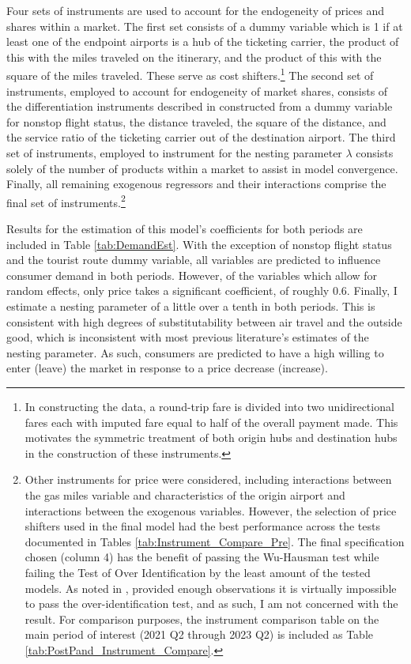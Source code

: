 \documentclass{article}
\begin{document}
	 Four sets of instruments are used to account for the endogeneity of prices and shares within a market. The first set consists of a dummy variable which is 1 if at least one of the endpoint airports is a hub of the ticketing carrier, the product of this with the miles traveled on the itinerary, and the product of this with the square of the miles traveled. These serve as cost shifters.\footnote{In constructing the data, a round-trip fare is divided into two unidirectional fares each with imputed fare equal to half of the overall payment made. This motivates the symmetric treatment of both origin hubs and destination hubs in the construction of these instruments.} The second set of instruments, employed to account for endogeneity of market shares, consists of the differentiation instruments described in \citet{gandhi_measuring_2019} constructed from a dummy variable for nonstop flight status, the distance traveled, the square of the distance, and the service ratio of the ticketing carrier out of the destination airport. The third set of instruments, employed to instrument for the nesting parameter $\lambda$ consists solely of the number of products within a market to assist in model convergence. Finally, all remaining exogenous regressors and their interactions comprise the final set of instruments.\footnote{Other instruments for price were considered, including interactions between the gas miles variable and characteristics of the origin airport and interactions between the exogenous variables. However, the selection of price shifters used in the final model had the best performance across the tests documented in Tables \ref{tab:Instrument_Compare_Pre}. The final specification chosen (column 4) has the benefit of passing the Wu-Hausman test while failing the Test of Over Identification by the least amount of the tested models. As noted in \citet{nevo_measuring_2001}, provided enough observations it is virtually impossible to pass the over-identification test, and as such, I am not concerned with the result. For comparison purposes, the instrument comparison table on the main period of interest (2021 Q2 through 2023 Q2) is included as Table \ref{tab:PostPand_Instrument_Compare}.}
	
    Results for the estimation of this model's coefficients for both periods are included in Table \ref{tab:DemandEst}. With the exception of nonstop flight status and the tourist route dummy variable, all variables are predicted to influence consumer demand in both periods. However, of the variables which allow for random effects, only price takes a significant coefficient, of roughly $0.6$. Finally, I estimate a nesting parameter of a little over a tenth in both periods. This is consistent with high degrees of substitutability between air travel and the outside good, which is inconsistent with most previous literature's estimates of the nesting parameter. As such, consumers are predicted to have a high willing to enter (leave) the market in response to a price decrease (increase).
\end{document}
